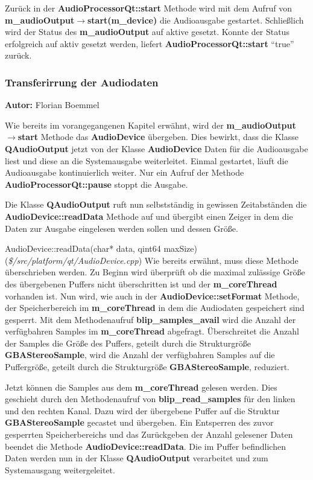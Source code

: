 \documentclass[11pt,a4paper]{scrartcl}
\newcommand{\AutorFlorian} {
    \vspace{-4mm}
    \large \textbf{Autor:} Florian Boemmel \normalsize
    \vspace{2mm}
}
\begin{document}
Zur\"uck in der \textbf{AudioProcessorQt::start} Methode wird mit dem Aufruf von \textbf{m\_audioOutput$\rightarrow$start(m\_device)} die Audioausgabe gestartet. Schlie{\ss}lich wird der Status des \textbf{m\_audioOutput} auf aktive gesetzt.
Konnte der Status erfolgreich auf aktiv gesetzt werden, liefert \textbf{AudioProcessorQt::start} \enquote{true} zur\"uck.
 
\subsubsection{Transferirrung der Audiodaten}
\AutorFlorian

Wie bereits im vorangegangenen Kapitel erw\"ahnt, wird der \textbf{m\_audioOutput$\rightarrow$start} Methode das \textbf{AudioDevice} \"ubergeben. Dies bewirkt, dass die Klasse \textbf{QAudioOutput} jetzt von der Klasse \textbf{AudioDevice} 
Daten f\"ur die Audioausgabe liest und diese an die Systemausgabe weiterleitet. Einmal gestartet, l\"auft die Audioausgabe kontinuierlich weiter. Nur ein Aufruf der Methode \textbf{AudioProcessorQt::pause} stoppt die Ausgabe.

Die Klasse \textbf{QAudioOutput} ruft nun selbstst\"andig  in gewissen Zeitabst\"anden die \textbf{AudioDevice::readData} Methode auf und \"ubergibt einen Zeiger in dem die Daten zur Ausgabe eingelesen werden sollen und dessen Gr\"o{\ss}e.

\vspace{5mm}
\large AudioDevice::readData(char* data, qint64 maxSize) \normalsize(\textit{\$/src/platform/qt/AudioDevice.cpp})
\vspace{2mm}\newline
Wie bereits erw\"ahnt, muss diese Methode \"uberschrieben werden. Zu Beginn wird \"uberpr\"uft ob die maximal zul\"assige Gr\"o{\ss}e des \"ubergebenen Puffers nicht \"uberschritten ist und der \textbf{m\_coreThread} vorhanden ist.
Nun wird, wie auch in der \textbf{AudioDevice::setFormat} Methode, der Speicherbereich im \textbf{m\_coreThread} in dem die Audiodaten gespeichert sind gesperrt.
Mit dem Methodenaufruf \textbf{blip\_samples\_avail} wird die Anzahl der verf\"ugbahren Samples im \textbf{m\_coreThread} abgefragt. \"Uberschreitet die Anzahl der Samples die Gr\"o{\ss}e des Puffers, geteilt durch die 
Strukturgr\"o{\ss}e \textbf{GBAStereoSample}, wird die Anzahl der verf\"ugbahren Samples auf die Puffergr\"o{\ss}e, geteilt durch die Strukturgr\"o{\ss}e \textbf{GBAStereoSample}, reduziert.

Jetzt k\"onnen die Samples aus dem \textbf{m\_coreThread} gelesen werden. Dies geschieht durch den Methodenaufruf von \textbf{blip\_read\_samples} f\"ur den linken und den rechten Kanal. 
Dazu wird der \"ubergebene Puffer auf die Struktur \textbf{GBAStereoSample} gecastet und \"ubergeben. Ein Entsperren des zuvor gesperrten Speicherbereichs und das Zur\"uckgeben der Anzahl gelesener Daten beendet die Methode
\textbf{AudioDevice::readData}. Die im Puffer befindlichen Daten werden nun in der Klasse \textbf{QAudioOutput} verarbeitet und zum Systemausgang weitergeleitet.
\end{document}
